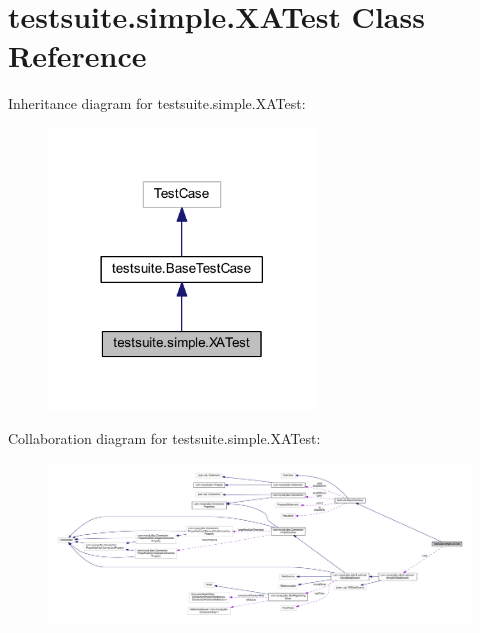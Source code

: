 \hypertarget{classtestsuite_1_1simple_1_1_x_a_test}{}\section{testsuite.\+simple.\+X\+A\+Test Class Reference}
\label{classtestsuite_1_1simple_1_1_x_a_test}


Inheritance diagram for testsuite.\+simple.\+X\+A\+Test\+:
\nopagebreak
\begin{figure}[H]
\begin{center}
\leavevmode
\includegraphics[width=201pt]{classtestsuite_1_1simple_1_1_x_a_test__inherit__graph}
\end{center}
\end{figure}


Collaboration diagram for testsuite.\+simple.\+X\+A\+Test\+:
\nopagebreak
\begin{figure}[H]
\begin{center}
\leavevmode
\includegraphics[width=350pt]{classtestsuite_1_1simple_1_1_x_a_test__coll__graph}
\end{center}
\end{figure}
